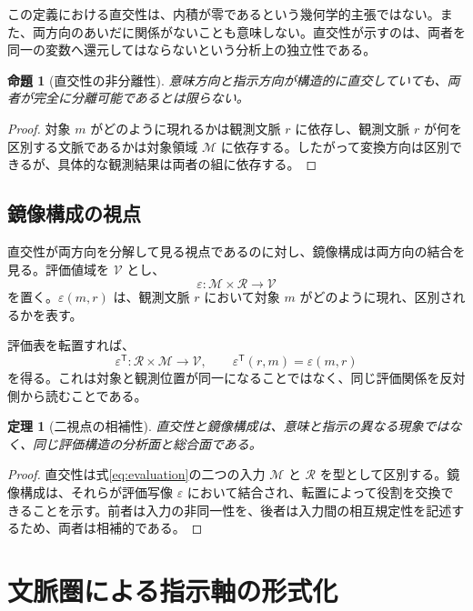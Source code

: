 \documentclass[a4paper,11pt]{ltjsarticle}
\theoremstyle{definition}
\theoremstyle{plain}
\newtheorem{proposition}[definition]{命題}
\newtheorem{theorem}[definition]{定理}
\newcommand{\Obj}{\mathcal M}
\newcommand{\Obs}{\mathcal R}
\newcommand{\Val}{\mathcal V}
\begin{document}
この定義における直交性は、内積が零であるという幾何学的主張ではない。また、両方向のあいだに関係がないことも意味しない。直交性が示すのは、両者を同一の変数へ還元してはならないという分析上の独立性である。

\begin{proposition}[直交性の非分離性]
意味方向と指示方向が構造的に直交していても、両者が完全に分離可能であるとは限らない。
\end{proposition}

\begin{proof}
対象 $m$ がどのように現れるかは観測文脈 $r$ に依存し、観測文脈 $r$ が何を区別する文脈であるかは対象領域 $\Obj$ に依存する。したがって変換方向は区別できるが、具体的な観測結果は両者の組に依存する。
\end{proof}

\subsection{鏡像構成の視点}

直交性が両方向を分解して見る視点であるのに対し、鏡像構成は両方向の結合を見る。評価値域を $\Val$ とし、
\begin{equation}
 \varepsilon:\Obj\times\Obs\longrightarrow\Val
 \label{eq:evaluation}
\end{equation}
を置く。$\varepsilon(m,r)$ は、観測文脈 $r$ において対象 $m$ がどのように現れ、区別されるかを表す。

評価表を転置すれば、
\begin{equation}
 \varepsilon^{\mathsf T}:\Obs\times\Obj\longrightarrow\Val,
 \qquad
 \varepsilon^{\mathsf T}(r,m)=\varepsilon(m,r)
\end{equation}
を得る。これは対象と観測位置が同一になることではなく、同じ評価関係を反対側から読むことである。

\begin{theorem}[二視点の相補性]
直交性と鏡像構成は、意味と指示の異なる現象ではなく、同じ評価構造の分析面と総合面である。
\end{theorem}

\begin{proof}
直交性は式\eqref{eq:evaluation}の二つの入力 $\Obj$ と $\Obs$ を型として区別する。鏡像構成は、それらが評価写像 $\varepsilon$ において結合され、転置によって役割を交換できることを示す。前者は入力の非同一性を、後者は入力間の相互規定性を記述するため、両者は相補的である。
\end{proof}

\section{文脈圏による指示軸の形式化}
\end{document}
